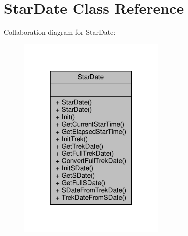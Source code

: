 \hypertarget{classStarDate}{}\section{Star\+Date Class Reference}
\label{classStarDate}


Collaboration diagram for Star\+Date\+:
\nopagebreak
\begin{figure}[H]
\begin{center}
\leavevmode
\includegraphics[width=202pt]{d3/d67/classStarDate__coll__graph}
\end{center}
\end{figure}
